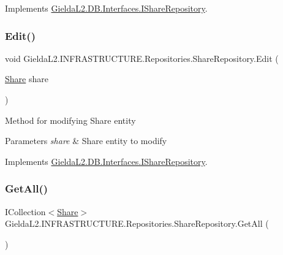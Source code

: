 Implements \mbox{\hyperlink{interface_gielda_l2_1_1_d_b_1_1_interfaces_1_1_i_share_repository_a92f21844eefac0604d9d195aa1f15214}{Gielda\+L2.\+D\+B.\+Interfaces.\+I\+Share\+Repository}}.

\mbox{\label{class_gielda_l2_1_1_i_n_f_r_a_s_t_r_u_c_t_u_r_e_1_1_repositories_1_1_share_repository_ac3b39b1ed8794698ad74054688667e6a}} 
\subsubsection{\texorpdfstring{Edit()}{Edit()}}
{\footnotesize\ttfamily void Gielda\+L2.\+I\+N\+F\+R\+A\+S\+T\+R\+U\+C\+T\+U\+R\+E.\+Repositories.\+Share\+Repository.\+Edit (\begin{DoxyParamCaption}\item[{\mbox{\hyperlink{class_gielda_l2_1_1_d_b_1_1_entities_1_1_share}{Share}}}]{share }\end{DoxyParamCaption})}



Method for modifying Share entity 


\begin{DoxyParams}{Parameters}
{\em share} & Share entity to modify\\
\hline
\end{DoxyParams}


Implements \mbox{\hyperlink{interface_gielda_l2_1_1_d_b_1_1_interfaces_1_1_i_share_repository_a68449340553ab4702be8f3559ea50131}{Gielda\+L2.\+D\+B.\+Interfaces.\+I\+Share\+Repository}}.

\mbox{\label{class_gielda_l2_1_1_i_n_f_r_a_s_t_r_u_c_t_u_r_e_1_1_repositories_1_1_share_repository_aef8271595f290092d8b99d4789c8f37c}} 
\subsubsection{\texorpdfstring{GetAll()}{GetAll()}}
{\footnotesize\ttfamily I\+Collection$<$\mbox{\hyperlink{class_gielda_l2_1_1_d_b_1_1_entities_1_1_share}{Share}}$>$ Gielda\+L2.\+I\+N\+F\+R\+A\+S\+T\+R\+U\+C\+T\+U\+R\+E.\+Repositories.\+Share\+Repository.\+Get\+All (\begin{DoxyParamCaption}{ }\end{DoxyParamCaption})}



